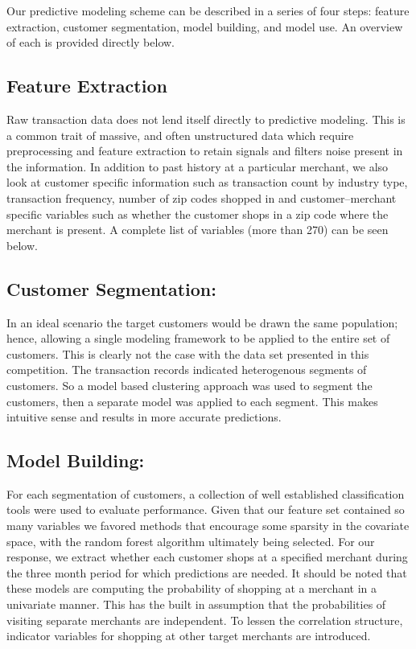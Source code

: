 \documentclass[12pt]{article} %
\begin{document}
Our predictive modeling scheme can be described in a series of four steps: feature extraction, customer segmentation, model building, and model use.  An overview of each is provided directly below.
\subsection*{Feature Extraction} 
Raw transaction data does not lend itself directly to predictive modeling.  This is a common trait of massive, and often unstructured data which require preprocessing and feature extraction to retain signals and filters noise present in the information.  In addition to past history at a particular merchant, we also look at customer specific information such as transaction count by industry type, transaction frequency, number of zip codes shopped in and customer--merchant specific variables such as whether the customer shops in a zip code where the merchant is present.  A complete list of variables (more than 270) can be seen below.  

\subsection*{Customer Segmentation:} 
In an ideal scenario the target customers would be drawn the same population; hence, allowing a single modeling framework to be applied to the entire set of customers.  This is clearly not the case with the data set presented in this competition.  The transaction records indicated  heterogenous segments of customers.  So a model based clustering approach was used to segment the customers, then a separate model was applied to each segment.  This makes intuitive sense and results in more accurate predictions. 

\subsection*{Model Building:} 
For each segmentation of customers, a collection of well established classification tools were used to evaluate performance.  Given that our feature set contained so many variables we favored methods that encourage some sparsity in the covariate space, with the random forest algorithm ultimately being selected.  For our response, we extract whether each customer shops at a specified merchant during the three month period for which predictions are needed.  It should be noted that these models are computing the probability of shopping at a merchant in a univariate manner.  This has the built in assumption that the probabilities of visiting separate merchants are independent.  To lessen the correlation structure, indicator variables for shopping at other target merchants are introduced. 
\end{document}
